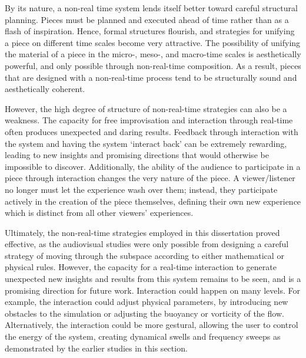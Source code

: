 By its nature, a non-real time system lends itself better toward careful structural planning. Pieces must be planned and executed ahead of time rather than as a flash of inspiration. Hence, formal structures flourish, and strategies for unifying a
piece on different time scales become very attractive. The possibility of unifying the material of a piece in the micro-, meso-, and macro-time scales is aesthetically powerful, and only possible through non-real-time composition. As a result, pieces that
are designed with a non-real-time process tend to be structurally sound and aesthetically coherent.

However, the high degree of structure of non-real-time strategies can also be a weakness. The capacity for free improvisation and interaction through real-time often produces unexpected and daring results. Feedback through interaction with the system and having the system `interact back' can be extremely rewarding, leading to new insights and promising directions that would otherwise be impossible to discover. Additionally, the ability of the audience to participate in a piece through interaction changes the very nature of the piece. A viewer/listener no longer must let the experience wash over them; instead, they participate actively in the creation of the piece themselves, defining their own new experience which is distinct from all other viewers' experiences.

Ultimately, the non-real-time strategies employed in this dissertation proved effective, as the audiovisual studies were only possible from designing a careful strategy of moving through the subspace according to either mathematical or physical rules. However, the capacity for a real-time interaction to generate unexpected new insights and results from this system remains to be seen, and is a promising direction for future work. Interaction could happen on many levels. For example, the interaction could adjust physical parameters, by introducing new obstacles to the simulation or adjusting the buoyancy or vorticity of the flow. Alternatively, the interaction could be more gestural, allowing the user to control the energy of the system, creating dynamical swells and frequency sweeps as demonstrated by the earlier studies in this section. 

